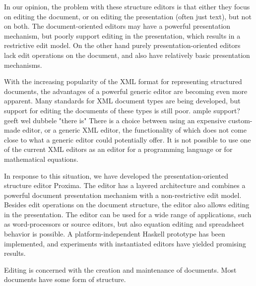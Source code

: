 In our opinion, the problem with these structure editors is that either they focus on editing the document, or on editing the presentation (often just text), but not on both. The document-oriented editors may have a powerful presentation mechanism, but poorly support editing in the presentation, which results in a restrictive edit model. On the other hand  purely presentation-oriented editors lack edit operations on the document, and also have relatively basic presentation mechanisms.

With the increasing popularity of the XML format for representing structured documents, the advantages of a powerful generic editor are becoming even more apparent. Many standards for XML document types are being developed, but support for editing the documents of these types is still poor. \bc ample support? geeft wel dubbele "there is" \ec There is a choice between using an expensive custom-made editor, or a generic XML editor, the functionality of which does  not come close to what a generic editor could potentially offer. It is not possible to use one of the current XML editors as an editor for a programming language or for mathematical equations.

In response to this situation, we have developed  the presentation-oriented structure editor Proxima. The editor has a layered architecture and combines a powerful document presentation mechanism with a non-restrictive edit model. Besides edit operations on the document structure, the editor also allows editing in the presentation. The editor can be used for a wide range of applications, such as word-processors or source editors, but also equation editing and spreadsheet behavior is possible. A platform-independent Haskell prototype has been implemented, and experiments with instantiated editors have yielded promising results.







%								
%								
%								


\bc
Editing is concerned with the creation and maintenance of documents.  
Most documents have some form of structure. 
\ec

